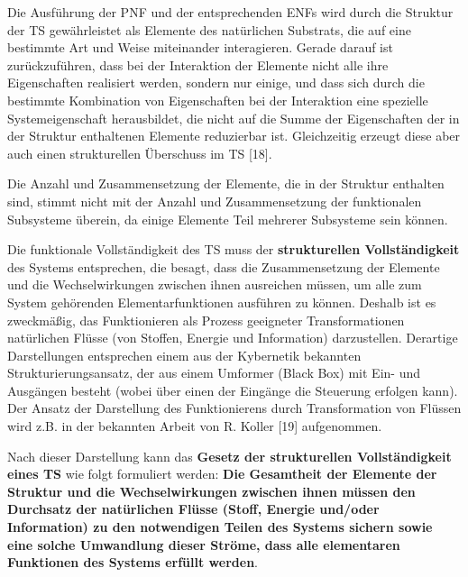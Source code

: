 \documentclass[11pt,a4paper]{article}
\begin{document}
Die Ausführung der PNF und der entsprechenden ENFs wird durch die Struktur der
TS gewährleistet als Elemente des natürlichen Substrats, die auf eine
bestimmte Art und Weise miteinander interagieren.  Gerade darauf ist
zurückzuführen, dass bei der Interaktion der Elemente nicht alle ihre
Eigenschaften realisiert werden, sondern nur einige, und dass sich durch die
bestimmte Kombination von Eigenschaften bei der Interaktion eine spezielle
Systemeigenschaft herausbildet, die nicht auf die Summe der Eigenschaften der
in der Struktur enthaltenen Elemente reduzierbar ist.  Gleichzeitig erzeugt
diese aber auch einen strukturellen Überschuss im TS [18].

Die Anzahl und Zusammensetzung der Elemente, die in der Struktur enthalten
sind, stimmt nicht mit der Anzahl und Zusammensetzung der funktionalen
Subsysteme überein, da einige Elemente Teil mehrerer Subsysteme sein können.

Die funktionale Vollständigkeit des TS muss der \textbf{strukturellen
  Vollständigkeit} des Systems entsprechen, die besagt, dass die
Zusammensetzung der Elemente und die Wechselwirkungen zwischen ihnen
ausreichen müssen, um alle zum System gehörenden Elementarfunktionen ausführen
zu können.  Deshalb ist es zweckmäßig, das Funktionieren als Prozess
geeigneter Transformationen natürlichen Flüsse (von Stoffen, Energie und
Information) darzustellen. Derartige Darstellungen entsprechen einem aus der
Kybernetik bekannten Strukturierungsansatz, der aus einem Umformer (Black Box)
mit Ein- und Ausgängen besteht (wobei über einen der Eingänge die Steuerung
erfolgen kann). Der Ansatz der Darstellung des Funktionierens durch
Transformation von Flüssen wird z.B. in der bekannten Arbeit von R. Koller
[19] aufgenommen.

Nach dieser Darstellung kann das \textbf{Gesetz der strukturellen
  Vollständigkeit eines TS} wie folgt formuliert werden: \textbf{Die
  Gesamtheit der Elemente der Struktur und die Wechselwirkungen zwischen ihnen
  müssen den Durchsatz der natürlichen Flüsse (Stoff, Energie und/oder
  Information) zu den notwendigen Teilen des Systems sichern sowie eine solche
  Umwandlung dieser Ströme, dass alle elementaren Funktionen des Systems
  erfüllt werden}.
\end{document}
